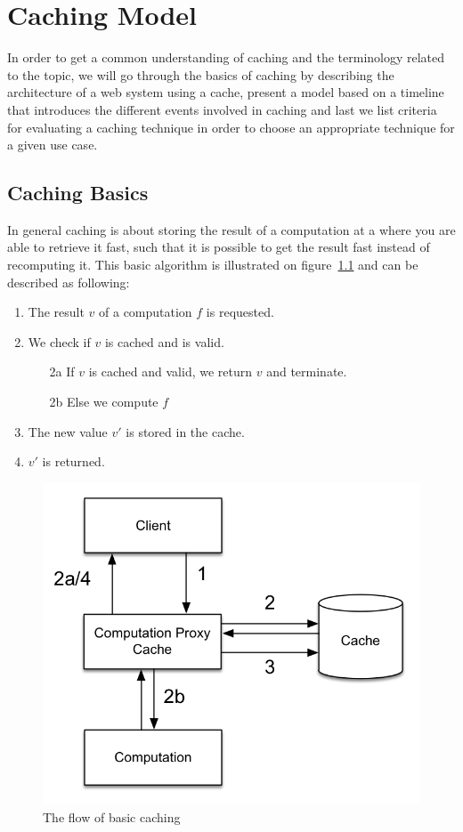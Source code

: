 \chapter{Caching Model}
\label{chapter:caching_model}

In order to get a common understanding of caching and the terminology related to the topic, we will go through the basics of caching by describing the architecture of a web system using a cache, present a model based on a timeline that introduces the different events involved in caching and last we list criteria for evaluating a caching technique in order to choose an appropriate technique for a given use case.

\section{Caching Basics}
\label{sec:caching_basics}

In general caching is about storing the result of a computation at a where you
are able to retrieve it fast, such that it is possible to get the result fast
instead of recomputing it. This basic algorithm is illustrated on
figure~\ref{fig:basic-caching} and can be described as following:

\begin{enumerate}
  \item The result $v$ of a computation $f$ is requested.
  \item We check if $v$ is cached and is valid.
    \begin{itemize}
      \item[2a] If $v$ is cached and valid, we return $v$ and terminate.
      \item[2b] Else we compute $f$
    \end{itemize}
  \item The new value $v'$ is stored in the cache.
  \item $v'$ is returned.
\end{enumerate}

\begin{figure}[ht!]
  \centering
  \includegraphics[width=0.5\linewidth]{figures/basic-caching-figure.png}
  \caption{The flow of basic caching}
  \label{fig:basic-caching}
\end{figure}

